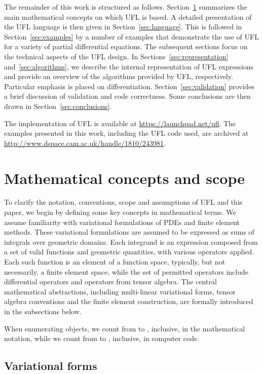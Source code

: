 \documentclass[prodmode,acmtoms]{acmsmall}
\begin{document}
The remainder of this work is structured as
follows. Section~\ref{sec:concepts} summarizes the main mathematical
concepts on which UFL is based. A detailed presentation of the UFL
language is then given in Section~\ref{sec:language}. This is followed
in Section~\ref{sec:examples} by a number of examples that demonstrate
the use of UFL for a variety of partial differential equations. The
subsequent sections focus on the technical aspects of the UFL design. In
Sections~\ref{sec:representation} and~\ref{sec:algorithms}, we describe
the internal representation of UFL expressions and provide an overview
of the algorithms provided by UFL, respectively. Particular emphasis
is placed on differentiation.  Section~\ref{sec:validation} provides a
brief discussion of validation and code correctness. Some conclusions
are then drawn in Section~\ref{sec:conclusions}.

The implementation of UFL is available at
\url{https://launchpad.net/ufl}. The examples presented
in this work, including the UFL code used, are archived at
\url{http://www.dspace.cam.ac.uk/handle/1810/243981}.

\section{Mathematical concepts and scope}
\label{sec:concepts}

To clarify the notation, conventions, scope and assumptions of UFL and
this paper, we begin by defining some key concepts in mathematical
terms. We assume familiarity with variational formulations of PDEs and
finite element methods.
These variational formulations are assumed to be expressed as sums of
integrals over geometric domains. Each integrand is an expression
composed from a set of valid functions and geometric quantities, with
various operators applied. Each such function is an element of a
function space, typically, but not necessarily, a finite element
space, while the set of permitted operators include differential
operators and operators from tensor algebra. The central mathematical
abstractions, including multi-linear variational forms, tensor algebra
conventions and the finite element construction, are formally
introduced in the subsections below.

When enumerating  objects, we count from  to , inclusive, in
the mathematical notation, while we count from  to ,
inclusive, in computer code.

\subsection{Variational forms}
\label{sec:variationalforms}
\end{document}
